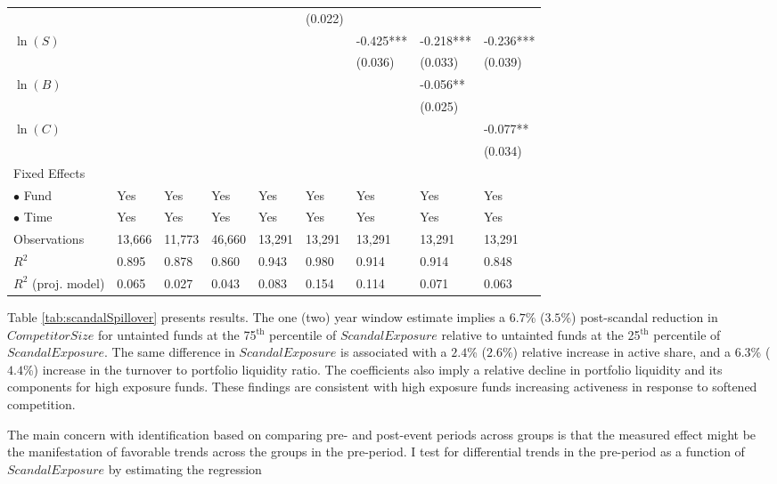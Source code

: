 \documentclass[openany]{book}
\theoremstyle{definition}
\theoremstyle{definition}
\theoremstyle{definition}
\theoremstyle{remark}
\begin{document}
\begin{table}[ht]
\begin{tabularx}{0.975\textwidth}{lYYYYYYYY}
   &  &  &  &  & (0.022) &  &  &  \\ 
  $\ln(S)$ &  &  &  &  &  & -0.425*** & -0.218*** & -0.236*** \\ 
   &  &  &  &  &  & (0.036) & (0.033) & (0.039) \\ 
  $\ln(B)$ &  &  &  &  &  &  & -0.056** &  \\ 
   &  &  &  &  &  &  & (0.025) &  \\ 
  $\ln(C)$ &  &  &  &  &  &  &  & -0.077** \\ 
   &  &  &  &  &  &  &  & (0.034) \\ 
  Fixed Effects &  &  &  &  &  &  &  &  \\ 
  $\bullet$ Fund & Yes & Yes & Yes & Yes & Yes & Yes & Yes & Yes \\ 
  $\bullet$ Time & Yes & Yes & Yes & Yes & Yes & Yes & Yes & Yes \\ 
  Observations & 13,666 & 11,773 & 46,660 & 13,291 & 13,291 & 13,291 & 13,291 & 13,291 \\ 
  $R^2$ & 0.895 & 0.878 & 0.860 & 0.943 & 0.980 & 0.914 & 0.914 & 0.848 \\ 
  $R^2$ (proj. model) & 0.065 & 0.027 & 0.043 & 0.083 & 0.154 & 0.114 & 0.071 & 0.063 \\ 
   \bottomrule
\end{tabularx}
\endgroup
\end{table}

Table \ref{tab:scandalSpillover} presents results. The one (two) year
window estimate implies a \(6.7\)\% (\(3.5\)\%) post-scandal reduction
in \(CompetitorSize\) for untainted funds at the 75\(^{\text{th}}\)
percentile of \(ScandalExposure\) relative to untainted funds at the
25\(^{\text{th}}\) percentile of \(ScandalExposure\). The same
difference in \(ScandalExposure\) is associated with a \(2.4\)\%
(\(2.6\)\%) relative increase in active share, and a \(6.3\)\%
(\(4.4\)\%) increase in the turnover to portfolio liquidity ratio. The
coefficients also imply a relative decline in portfolio liquidity and
its components for high exposure funds. These findings are consistent
with high exposure funds increasing activeness in response to softened
competition.

The main concern with identification based on comparing pre- and
post-event periods across groups is that the measured effect might be
the manifestation of favorable trends across the groups in the
pre-period. I test for differential trends in the pre-period as a
function of \(ScandalExposure\) by estimating the regression
\end{document}
